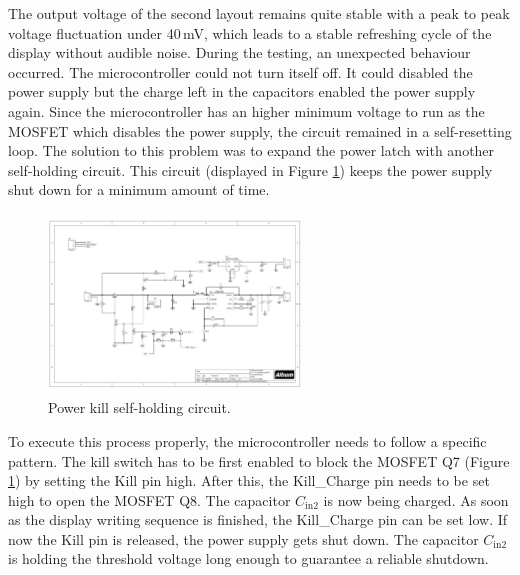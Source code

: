 The output voltage of the second layout remains quite stable with a peak to peak voltage fluctuation under 40\,mV, which leads to a stable refreshing cycle of the display without audible noise. During the testing, an unexpected behaviour occurred.
The microcontroller could not turn itself off.
It could disabled the power supply but the charge left in the capacitors enabled the power supply again.
Since the microcontroller has an higher minimum voltage to run as the MOSFET which disables the power supply, the circuit remained in a self-resetting loop.
\newpage
The solution to this problem was to expand the power latch with another self-holding circuit.
This circuit (displayed in Figure \ref{development:kill}) keeps the power supply shut down for a minimum amount of time. 

 \begin{figure}[ht]
	\centering
	\includegraphics[clip, trim=10.5cm 4cm 12cm 13cm, width=0.6\textwidth]{4-development/hardware/graphics/PowerLatch/PwrLatch_V3_sch.pdf}
	\caption{Power kill self-holding circuit.\label{development:kill}}
\end{figure}

To execute this process properly, the microcontroller needs to follow a specific pattern.
The kill switch has to be first enabled to block the MOSFET Q7  (Figure \ref{development:kill}) by setting the Kill pin high. After this, the Kill\_Charge pin needs to be set high to open the MOSFET Q8.
The capacitor $C_ \text{in2}$ is now being charged.
As soon as the display writing sequence is finished, the Kill\_Charge pin can be set low. If now the Kill pin is released, the power supply gets shut down. The capacitor $C_\text{in2}$ is holding the threshold voltage long enough to guarantee a reliable shutdown.   

